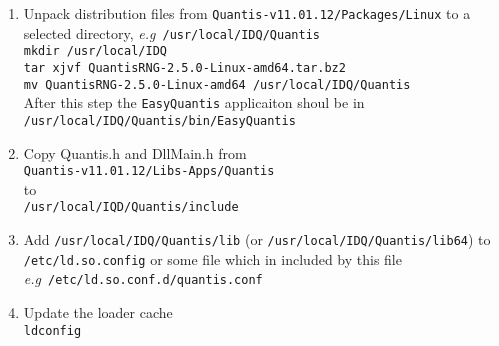 \documentclass[a4paper]{scrartcl}
\newcommand{\eg}{\textsl{e.g}}
\begin{document}
\begin{enumerate}
    \item Unpack distribution files from
   \texttt{Quantis-v11.01.12/Packages/Linux} to a selected directory, \eg\
   \texttt{/usr/local/IDQ/Quantis}\\ \texttt{mkdir /usr/local/IDQ}\\ \texttt{tar
   xjvf QuantisRNG-2.5.0-Linux-amd64.tar.bz2}\\ \texttt{mv
   QuantisRNG-2.5.0-Linux-amd64 /usr/local/IDQ/Quantis}\\
    After this step the \texttt{EasyQuantis} applicaiton shoul be in\\ \texttt{/usr/local/IDQ/Quantis/bin/EasyQuantis}
    \item Copy {Quantis.h} and {DllMain.h} from\\
   \texttt{Quantis-v11.01.12/Libs-Apps/Quantis}\\ to\\
   \texttt{/usr/local/IQD/Quantis/include}
    \item Add \texttt{/usr/local/IDQ/Quantis/lib} (or
    \texttt{/usr/local/IDQ/Quantis/lib64}) to \texttt{/etc/ld.so.config} or some
    file which in included by this file \eg\
    \texttt{/etc/ld.so.conf.d/quantis.conf}
    \item Update the loader cache\\
    \texttt{ldconfig}
\end{enumerate}
\end{document}

